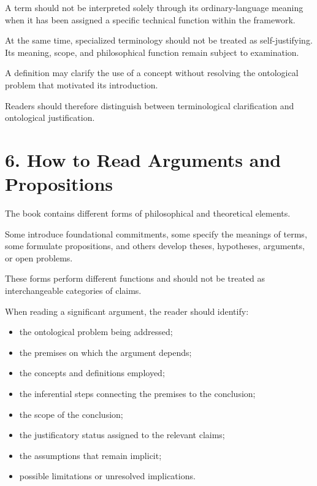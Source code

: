 A term should not be interpreted solely
through its ordinary-language meaning
when it has been assigned a specific
technical function within the framework.

At the same time, specialized terminology
should not be treated as self-justifying.
Its meaning, scope, and philosophical
function remain subject to examination.

A definition may clarify the use of a
concept without resolving the ontological
problem that motivated its introduction.

Readers should therefore distinguish
between terminological clarification
and ontological justification.


\section*{6. How to Read Arguments and Propositions}

The book contains different forms of
philosophical and theoretical elements.

Some introduce foundational commitments,
some specify the meanings of terms,
some formulate propositions, and others
develop theses, hypotheses, arguments,
or open problems.

These forms perform different functions
and should not be treated as interchangeable
categories of claims.

When reading a significant argument,
the reader should identify:

\begin{itemize}

    \item the ontological problem being
    addressed;

    \item the premises on which the
    argument depends;

    \item the concepts and definitions
    employed;

    \item the inferential steps connecting
    the premises to the conclusion;

    \item the scope of the conclusion;

    \item the justificatory status assigned
    to the relevant claims;

    \item the assumptions that remain
    implicit;

    \item possible limitations or unresolved
    implications.

\end{itemize}

